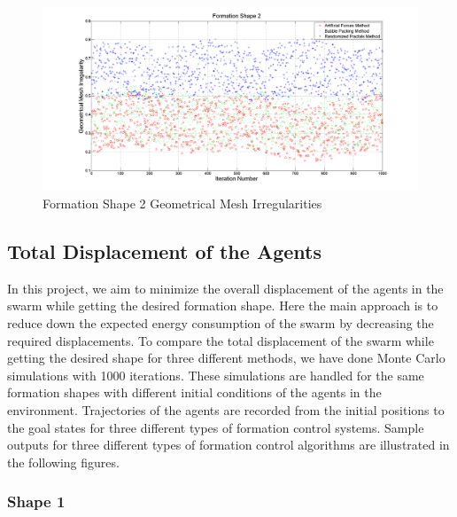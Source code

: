 \begin{figure}[H]
\caption{Formation Shape 2 Geometrical Mesh Irregularities} \label{geometric_ref_2}
\centerline{\includegraphics[scale = 0.35]{Geometrical_Irr_2}}
\end{figure} 	
		
\subsection{Total Displacement of the Agents}  \label{total_dist_ref}
		
In this project, we aim to minimize the overall displacement of the agents in the swarm while getting the desired formation shape. Here the main approach is to reduce down the expected energy consumption of the swarm by decreasing the required displacements. To compare the total displacement of the swarm while getting the desired shape for three different methods, we have done Monte Carlo simulations with 1000 iterations. These simulations are handled for the same formation shapes with different initial conditions of the agents in the environment. Trajectories of the agents are recorded from the initial positions to the goal states for three different types of formation control systems. Sample outputs for three different types of formation control algorithms are illustrated in the following figures.
		
\subsubsection{Shape 1}\hspace{0pt} \\
		
